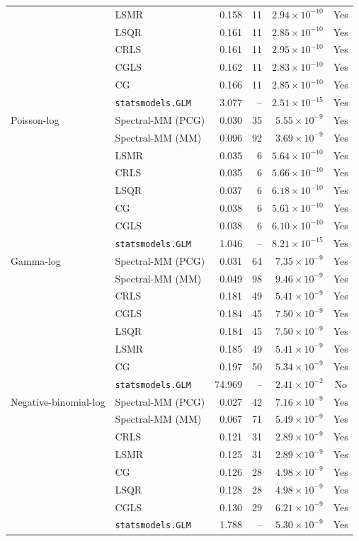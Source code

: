 \begin{longtable}{llrrrc}
 & LSMR & 0.158 & 11 & $2.94\times10^{-10}$ & Yes \\
 & LSQR & 0.161 & 11 & $2.85\times10^{-10}$ & Yes \\
 & CRLS & 0.161 & 11 & $2.95\times10^{-10}$ & Yes \\
 & CGLS & 0.162 & 11 & $2.83\times10^{-10}$ & Yes \\
 & CG & 0.166 & 11 & $2.85\times10^{-10}$ & Yes \\
 & \texttt{statsmodels.GLM} & 3.077 & -- & $2.51\times10^{-15}$ & Yes \\
\midrule
Poisson-log & Spectral-MM (PCG) & 0.030 & 35 & $5.55\times10^{-9}$ & Yes \\
 & Spectral-MM (MM) & 0.096 & 92 & $3.69\times10^{-9}$ & Yes \\
 & LSMR & 0.035 & 6 & $5.64\times10^{-10}$ & Yes \\
 & CRLS & 0.035 & 6 & $5.66\times10^{-10}$ & Yes \\
 & LSQR & 0.037 & 6 & $6.18\times10^{-10}$ & Yes \\
 & CG & 0.038 & 6 & $5.61\times10^{-10}$ & Yes \\
 & CGLS & 0.038 & 6 & $6.10\times10^{-10}$ & Yes \\
 & \texttt{statsmodels.GLM} & 1.046 & -- & $8.21\times10^{-15}$ & Yes \\
\midrule
Gamma-log & Spectral-MM (PCG) & 0.031 & 64 & $7.35\times10^{-9}$ & Yes \\
 & Spectral-MM (MM) & 0.049 & 98 & $9.46\times10^{-9}$ & Yes \\
 & CRLS & 0.181 & 49 & $5.41\times10^{-9}$ & Yes \\
 & CGLS & 0.184 & 45 & $7.50\times10^{-9}$ & Yes \\
 & LSQR & 0.184 & 45 & $7.50\times10^{-9}$ & Yes \\
 & LSMR & 0.185 & 49 & $5.41\times10^{-9}$ & Yes \\
 & CG & 0.197 & 50 & $5.34\times10^{-9}$ & Yes \\
 & \texttt{statsmodels.GLM} & 74.969 & -- & $2.41\times10^{-2}$ & No \\
\midrule
Negative-binomial-log & Spectral-MM (PCG) & 0.027 & 42 & $7.16\times10^{-9}$ & Yes \\
 & Spectral-MM (MM) & 0.067 & 71 & $5.49\times10^{-9}$ & Yes \\
 & CRLS & 0.121 & 31 & $2.89\times10^{-9}$ & Yes \\
 & LSMR & 0.125 & 31 & $2.89\times10^{-9}$ & Yes \\
 & CG & 0.126 & 28 & $4.98\times10^{-9}$ & Yes \\
 & LSQR & 0.128 & 28 & $4.98\times10^{-9}$ & Yes \\
 & CGLS & 0.130 & 29 & $6.21\times10^{-9}$ & Yes \\
 & \texttt{statsmodels.GLM} & 1.788 & -- & $5.30\times10^{-9}$ & Yes \\
\end{longtable}
